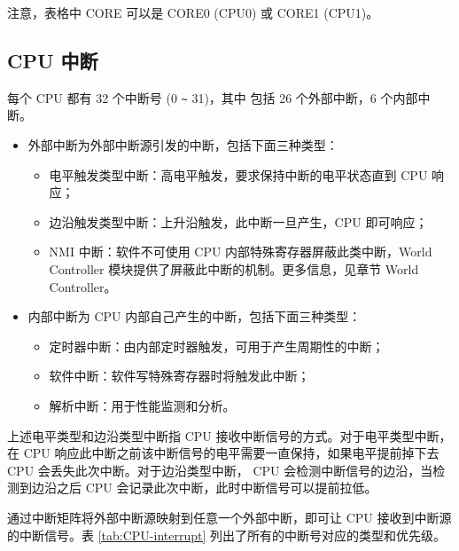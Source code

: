 \documentclass[main\_\_CN.tex]{subfiles}
\begin{document}
注意，表格中 CORE 可以是 CORE0 (CPU0) 或 CORE1 (CPU1)。
\clearpage
\begin{landscape}



\end{landscape}
\restoregeometry
\clearpage


\subsection{CPU 中断}

每个 CPU 都有 32 个中断号 (0 \verb+~+ 31)，其中 包括 26 个外部中断，6 个内部中断。

\begin{itemize}
    \item 外部中断为外部中断源引发的中断，包括下面三种类型：
    \begin{itemize}
    \item 电平触发类型中断：高电平触发，要求保持中断的电平状态直到 CPU 响应；
    \item 边沿触发类型中断：上升沿触发，此中断一旦产生，CPU 即可响应；
    \item NMI 中断：软件不可使用 CPU 内部特殊寄存器屏蔽此类中断，World Controller 模块提供了屏蔽此中断的机制。更多信息，见章节 World Controller。
\end{itemize}
    \item 内部中断为 CPU 内部自己产生的中断，包括下面三种类型：
    \begin{itemize}
    \item 定时器中断：由内部定时器触发，可用于产生周期性的中断；
    \item 软件中断：软件写特殊寄存器时将触发此中断；
    \item 解析中断：用于性能监测和分析。
    \end{itemize}
\end{itemize}

上述电平类型和边沿类型中断指 CPU 接收中断信号的方式。对于电平类型中断，在 CPU 响应此中断之前该中断信号的电平需要一直保持，如果电平提前掉下去 CPU 会丢失此次中断。对于边沿类型中断，
CPU 会检测中断信号的边沿，当检测到边沿之后 CPU 会记录此次中断，此时中断信号可以提前拉低。

通过中断矩阵将外部中断源映射到任意一个外部中断，即可让 CPU 接收到中断源的中断信号。表 \ref{tab:CPU-interrupt} 列出了所有的中断号对应的类型和优先级。
\end{document}
